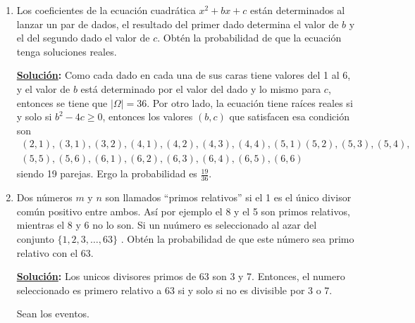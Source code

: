 \documentclass[11pt,letterpaper]{report}
\newcommand{\sol}{\textbf{\underline{Solución}: }} %
\begin{document}
\begin{enumerate}
\begin{itemize}
    \sol $\frac{\binom{13}{2}  \binom{4}{2} \binom{4}{2}  \binom {44}{1}}{\binom{52}{5}}$
    

    \item una Tercia?
    
    \sol $\frac{{13}  \binom{4}{3} \binom{12}{2} \binom{4}{1} \binom{4}{1}}{\binom{52}{5}}$


    \item un Poker? \textbf{Tenemos un Poker cuando la mano que nos tocaron contiene 4 cartas con la
    misma denominación y de diferente palo}

    \sol $\frac{{13}  \binom{4}{4} \binom{48}{1}}{\binom{52}{5}}$
    
\end{itemize}

\item Los coeficientes de la ecuación cuadrática $x^2 + bx + c$ están determinados al lanzar un par
de dados, el resultado del primer dado determina el valor de $b$ y el del segundo dado el valor de
$c$. Obtén la probabilidad de que la ecuación tenga soluciones reales.

\sol Como cada dado en cada una de sus caras tiene valores del 1 al 6, y el valor de $b$ está
determinado por el valor del dado y lo mismo para $c$, entonces se tiene que $|\Omega|=36$.
Por otro lado, la ecuación tiene raíces reales si y solo si $b^2 - 4c \geq 0$, entonces los valores
$(b,c)$ que satisfacen esa condición son 
\begin{multline*}
    (2,1),(3,1),(3,2),(4,1),(4,2),(4,3),(4,4),(5,1)(5,2),(5,3),(5,4),\\
    (5,5),(5,6),(6,1),(6,2),(6,3),(6,4),(6,5),(6,6)
\end{multline*}
siendo 19 parejas. Ergo la probabilidad es $\frac{19}{36}$.

\item Dos números $m$ y $n$ son llamados ``primos relativos'' si el 1 es el único divisor común
positivo entre ambos. Así por ejemplo el 8 y el 5 son primos relativos, mientras el 8 y 6 no lo son.
Si un nuúmero es seleccionado al azar del conjunto $\{ 1, 2, 3,\ldots, 63 \}$ . Obtén la
probabilidad de que este número sea primo relativo con el 63.

\sol Los unicos divisores primos de 63 son 3 y 7. Entonces, el numero seleccionado es primero
relativo a 63 si y solo si no es divisible por 3 o 7.

Sean los eventos.


\end{enumerate}
\end{document}
